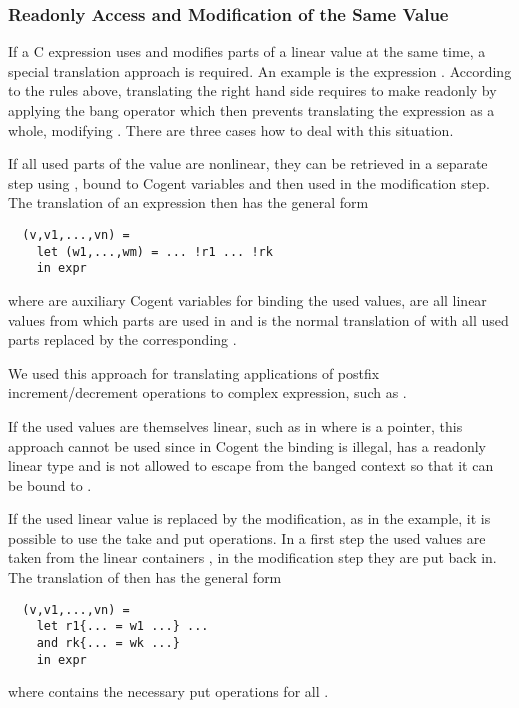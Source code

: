 \subsubsection{Readonly Access and Modification of the Same Value}

If a C expression uses and modifies parts of a linear value at the same time, a special translation approach is required.
An example is the expression . According to the rules above, translating the right hand side
requires to make  readonly by applying the bang operator \code{!} which then prevents translating the expression
as a whole, modifying . There are three cases how to deal with this situation.

If all used parts of the value are nonlinear, they can be retrieved in a separate step using \code{!}, bound to Cogent 
variables and then used in the modification step. The translation of an expression  then has the general form
\begin{verbatim}
  (v,v1,...,vn) = 
    let (w1,...,wm) = ... !r1 ... !rk
    in expr
\end{verbatim}
where  are auxiliary Cogent variables for binding the used values,  are all linear values
from which parts are used in  and  is the 
normal translation of  with all used parts replaced by the corresponding .

We used this approach for translating applications of postfix increment/decrement operations to complex expression,
such as .

If the used values are themselves linear, such as in  where  is a pointer, this approach
cannot be used since in Cogent the binding  is illegal,  has a readonly linear type and
is not allowed to escape from the banged context so that it can be bound to .

If the used linear value is replaced by the modification, as in the example, it is possible to use the take and put
operations. In a first step the used values are taken from the linear containers , in the modification
step they are put back in. The translation of  then has the general form
\begin{verbatim}
  (v,v1,...,vn) = 
    let r1{... = w1 ...} ...
    and rk{... = wk ...}
    in expr
\end{verbatim}
where  contains the necessary put operations for all .

